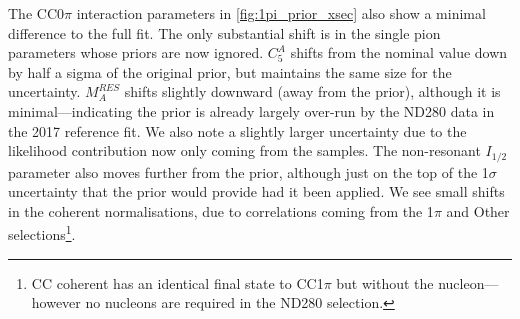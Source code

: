 The CC0$\pi$ interaction parameters in \autoref{fig:1pi_prior_xsec} also show a minimal difference to the full fit. The only substantial shift is in the single pion parameters whose priors are now ignored. $C_5^A$ shifts from the nominal value down by half a sigma of the original prior, but maintains the same size for the uncertainty. $M_A^{RES}$ shifts slightly downward (away from the prior), although it is minimal---indicating the prior is already largely over-run by the ND280 data in the 2017 reference fit. We also note a slightly larger uncertainty due to the likelihood contribution now only coming from the samples. The non-resonant $I_{1/2}$ parameter also moves further from the prior, although just on the top of the 1$\sigma$ uncertainty that the prior would provide had it been applied. We see small shifts in the coherent normalisations, due to correlations coming from the 1$\pi$ and Other selections\footnote{CC coherent has an identical final state to CC1$\pi$ but without the nucleon---however no nucleons are required in the ND280 selection.}.
